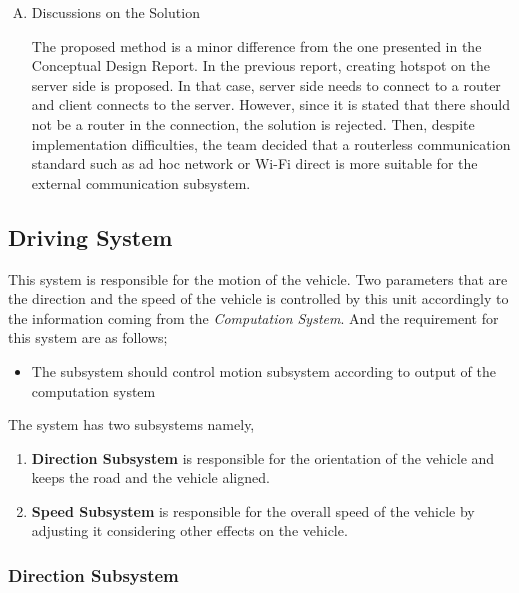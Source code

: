 \documentclass[a4paper,12pt]{article}
\begin{document}
\begin{enumerate}[A.]
\item {Discussions on the Solution}


The proposed method is a minor difference from the one presented in the Conceptual Design Report. In the previous report, creating hotspot on the server side is proposed. In that case, server side needs to connect to a router and client connects to the server. However, since it is stated that there should not be a router in the connection, the solution is rejected. Then, despite implementation difficulties, the team decided that a routerless communication standard such as ad hoc network or Wi-Fi direct is more suitable for the external communication subsystem. 

\end{enumerate}




\subsection{Driving System}


This system is responsible for the motion of the vehicle. Two parameters that are the direction and the speed of the vehicle is controlled by this unit accordingly to the information coming from the \textit{Computation System}. And the requirement for this system are as follows;


\begin{itemize}

\item The subsystem should control motion subsystem according to output of the computation system			

\end{itemize}



\noindent The system has two subsystems namely,


\begin{enumerate}

\item \textbf{Direction Subsystem} is responsible for the orientation of the vehicle and keeps the road and the vehicle aligned.

\item \textbf{Speed Subsystem} is responsible for the overall speed of the vehicle by adjusting it considering other effects on the vehicle.

\end{enumerate}


\subsubsection{Direction Subsystem}
\end{document}
